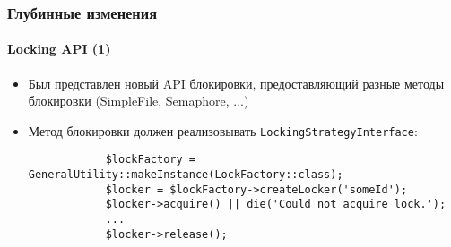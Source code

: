 \begin{frame}[fragile]
	\frametitle{Глубинные изменения}
	\framesubtitle{Locking API (1)}

	\begin{itemize}

		\item Был представлен новый API блокировки, предоставляющий разные методы блокировки (SimpleFile, Semaphore, ...)
		\item Метод блокировки должен реализовывать \small\texttt{LockingStrategyInterface}\normalsize:
		\begin{lstlisting}
			$lockFactory = GeneralUtility::makeInstance(LockFactory::class);
			$locker = $lockFactory->createLocker('someId');
			$locker->acquire() || die('Could not acquire lock.');
			...
			$locker->release();
		\end{lstlisting}

	\end{itemize}

\end{frame}

